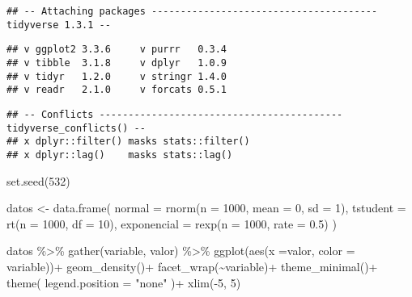 \documentclass[
]{article}
\newenvironment{Shaded}{\begin{snugshade}}{\end{snugshade}}
\newcommand{\AttributeTok}[1]{\textcolor[rgb]{0.77,0.63,0.00}{#1}}
\newcommand{\DecValTok}[1]{\textcolor[rgb]{0.00,0.00,0.81}{#1}}
\newcommand{\FloatTok}[1]{\textcolor[rgb]{0.00,0.00,0.81}{#1}}
\newcommand{\FunctionTok}[1]{\textcolor[rgb]{0.00,0.00,0.00}{#1}}
\newcommand{\NormalTok}[1]{#1}
\newcommand{\OtherTok}[1]{\textcolor[rgb]{0.56,0.35,0.01}{#1}}
\newcommand{\SpecialCharTok}[1]{\textcolor[rgb]{0.00,0.00,0.00}{#1}}
\newcommand{\StringTok}[1]{\textcolor[rgb]{0.31,0.60,0.02}{#1}}
\begin{document}
\begin{verbatim}
## -- Attaching packages --------------------------------------- tidyverse 1.3.1 --
\end{verbatim}

\begin{verbatim}
## v ggplot2 3.3.6     v purrr   0.3.4
## v tibble  3.1.8     v dplyr   1.0.9
## v tidyr   1.2.0     v stringr 1.4.0
## v readr   2.1.0     v forcats 0.5.1
\end{verbatim}

\begin{verbatim}
## -- Conflicts ------------------------------------------ tidyverse_conflicts() --
## x dplyr::filter() masks stats::filter()
## x dplyr::lag()    masks stats::lag()
\end{verbatim}

\begin{Shaded}
\begin{Highlighting}[]
\FunctionTok{set.seed}\NormalTok{(}\DecValTok{532}\NormalTok{)}

\NormalTok{datos }\OtherTok{\textless{}{-}} 
  \FunctionTok{data.frame}\NormalTok{(}
  \AttributeTok{normal =} \FunctionTok{rnorm}\NormalTok{(}\AttributeTok{n =} \DecValTok{1000}\NormalTok{, }\AttributeTok{mean =} \DecValTok{0}\NormalTok{, }\AttributeTok{sd =} \DecValTok{1}\NormalTok{),}
  \AttributeTok{tstudent =} \FunctionTok{rt}\NormalTok{(}\AttributeTok{n =} \DecValTok{1000}\NormalTok{, }\AttributeTok{df =} \DecValTok{10}\NormalTok{),}
  \AttributeTok{exponencial =} \FunctionTok{rexp}\NormalTok{(}\AttributeTok{n =} \DecValTok{1000}\NormalTok{, }\AttributeTok{rate =} \FloatTok{0.5}\NormalTok{)}
\NormalTok{)}

\NormalTok{datos }\SpecialCharTok{\%\textgreater{}\%} 
  \FunctionTok{gather}\NormalTok{(variable, valor) }\SpecialCharTok{\%\textgreater{}\%} 
  \FunctionTok{ggplot}\NormalTok{(}\FunctionTok{aes}\NormalTok{(}\AttributeTok{x =}\NormalTok{valor, }\AttributeTok{color =}\NormalTok{ variable))}\SpecialCharTok{+}
  \FunctionTok{geom\_density}\NormalTok{()}\SpecialCharTok{+}
  \FunctionTok{facet\_wrap}\NormalTok{(}\SpecialCharTok{\textasciitilde{}}\NormalTok{variable)}\SpecialCharTok{+}
  \FunctionTok{theme\_minimal}\NormalTok{()}\SpecialCharTok{+}
  \FunctionTok{theme}\NormalTok{(}
    \AttributeTok{legend.position =} \StringTok{"none"}
\NormalTok{  )}\SpecialCharTok{+}
  \FunctionTok{xlim}\NormalTok{(}\SpecialCharTok{{-}}\DecValTok{5}\NormalTok{, }\DecValTok{5}\NormalTok{)}
\end{Highlighting}
\end{Shaded}
\end{document}
